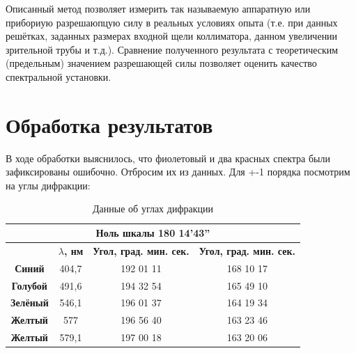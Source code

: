 \documentclass[a4paper, 12pt]{article}
\begin{document}
Описанный метод позволяет измерить так называемую аппаратную или прибориую разрешаюпцую силу в реальных условиях опыта (т.е. при данных решётках, заданных размерах входной щели коллиматора, данном увеличении зрительной трубы и т.д.). Сравнение полученного результата с теоретическим (предельным) значением разрешающей силы позволяет оценить качество спектральной установки.
\section{Обработка результатов}
В ходе обработки выяснилось, что фиолетовый и два красных спектра были зафиксированы ошибочно. Отбросим их из данных.
Для +-1 порядка посмотрим на углы дифракции:

\begin{table}[H]
	\centering
	\begin{tabular}{|cccc|}
	\hline
	\multicolumn{4}{|c|}{\textbf{Ноль шкалы 180 14'43''}}                                                                                                                       \\ \hline
	\multicolumn{1}{|c|}{}                 & \multicolumn{1}{c|}{\textbf{$\lambda$, нм}} & \multicolumn{1}{c|}{\textbf{Угол, град. мин. сек.}} & \textbf{Угол, град. мин. сек.} \\ \hline
	\multicolumn{1}{|c|}{\textbf{Синий}}   & \multicolumn{1}{c|}{404,7}                  & \multicolumn{1}{c|}{192 01 11}                      & 168 10 17                      \\ \hline
	\multicolumn{1}{|c|}{\textbf{Голубой}} & \multicolumn{1}{c|}{491,6}                  & \multicolumn{1}{c|}{194 32 54}                      & 165 49 10                      \\ \hline
	\multicolumn{1}{|c|}{\textbf{Зелёный}} & \multicolumn{1}{c|}{546,1}                  & \multicolumn{1}{c|}{196 01 37}                      & 164 19 34                      \\ \hline
	\multicolumn{1}{|c|}{\textbf{Желтый}}  & \multicolumn{1}{c|}{577}                    & \multicolumn{1}{c|}{196 56 40}                      & 163 23 46                      \\ \hline
	\multicolumn{1}{|c|}{\textbf{Желтый}}  & \multicolumn{1}{c|}{579,1}                  & \multicolumn{1}{c|}{197 00 18}                      & 163 20 06                      \\ \hline
	\end{tabular}
	\caption{Данные об углах дифракции}
	\label{tab:data_1}
\end{table}
\end{document}
